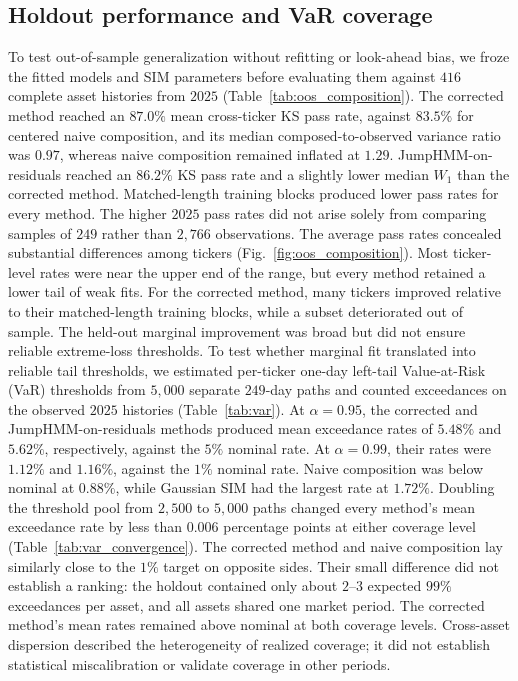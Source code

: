 \subsection{Holdout performance and VaR coverage}

To test out-of-sample generalization without refitting or look-ahead
bias, we froze the fitted models and SIM parameters before evaluating
them against $416$ complete asset histories from $2025$
(Table~\ref{tab:oos_composition}). The corrected
method reached an $87.0\%$ mean cross-ticker KS pass rate, against
$83.5\%$ for centered naive composition, and its median composed-to-observed
variance ratio was $0.97$, whereas naive composition remained
inflated at $1.29$. JumpHMM-on-residuals reached an $86.2\%$ KS pass
rate and a slightly lower median $W_1$ than the corrected method. Matched-length
training blocks produced lower pass rates for every method. The higher
$2025$ pass rates did not arise solely from comparing samples of
$249$ rather than $2{,}766$ observations.
The average pass rates concealed substantial differences among
tickers (Fig.~\ref{fig:oos_composition}). Most ticker-level rates
were near the upper end of the range, but every method retained a
lower tail of weak fits. For the corrected method, many tickers improved
relative to their matched-length training blocks, while a subset
deteriorated out of sample.
The held-out marginal improvement was broad but did not ensure
reliable extreme-loss thresholds.
To test whether marginal fit translated into reliable tail thresholds,
we estimated per-ticker one-day left-tail Value-at-Risk (VaR)
thresholds from $5{,}000$ separate $249$-day paths and counted
exceedances on the observed $2025$ histories (Table~\ref{tab:var}).
At $\alpha=0.95$, the corrected and JumpHMM-on-residuals methods
produced mean exceedance rates of $5.48\%$ and $5.62\%$, respectively,
against the $5\%$ nominal rate. At $\alpha=0.99$, their rates were
$1.12\%$ and $1.16\%$, against the $1\%$ nominal rate. Naive
composition was below nominal at $0.88\%$, while Gaussian SIM had
the largest rate at $1.72\%$. Doubling the threshold pool from
$2{,}500$ to $5{,}000$ paths changed every method's mean exceedance
rate by less than $0.006$ percentage points at either coverage level
(Table~\ref{tab:var_convergence}). The corrected method and
naive composition lay similarly close to the $1\%$ target on
opposite sides. Their small difference did not establish a ranking:
the holdout contained only about $2$--$3$ expected $99\%$ exceedances
per asset, and all assets shared one market period. The corrected
method's mean rates remained above nominal at both coverage levels. Cross-asset dispersion described the
heterogeneity of realized coverage; it did not establish statistical
miscalibration or validate coverage in other periods.

